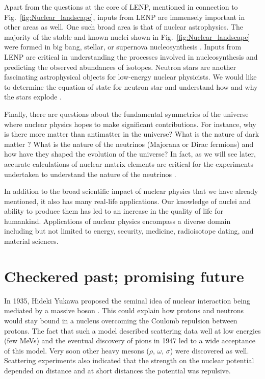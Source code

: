 	Apart from the questions at the core of LENP, mentioned in connection to
	Fig.~\ref{fig:Nuclear_landscape}, inputs from LENP are immensely important
	in other areas as well.  One such broad area is that of nuclear astrophysics.
	The majority of the stable
	and known nuclei shown in Fig.~\ref{fig:Nuclear_landscape} were formed in
	big bang, stellar, or supernova nucleosynthesis
	\cite{Cyburt:2015mya, PAS:9305903}.  Inputs from LENP are
	critical in understanding the processes involved in nucleosynthesis and
	predicting the observed abundances of isotopes.
	Neutron stars are another fascinating astrophysical objects for low-energy
	nuclear physicists.  We would like to determine the equation of state for
	neutron star and understand how and why the stars explode
	\cite{Lattimer:2015eaa}.

	Finally, there are questions about the fundamental symmetries of the universe
	where
	nuclear physics hopes to make significant contributions.  For instance,
	why is there more matter than antimatter in the universe?  What is the nature
	of dark matter \cite{Feng:2010gw}?  What is the nature of the neutrinos
	(Majorana or Dirac
	fermions) and how have they shaped the evolution of the universe?
	In fact, as we will see later, accurate calculations of nuclear matrix
	elements are critical for the experiments undertaken to understand the
	nature of the	neutrinos \cite{Avignone:2007fu}.

	In addition to the broad scientific impact of nuclear physics that we have
	already mentioned, it also has many real-life applications.  Our knowledge of
	nuclei and ability to produce them has led to an increase in the quality of
	life
	for humankind.  Applications of nuclear physics encompass a diverse
	domain including but not limited to energy, security, medicine,
	radioisotope dating, and material sciences.


	\section{Checkered past; promising future}

	In 1935, Hideki Yukawa proposed the seminal idea of nuclear interaction
	being mediated by a massive boson \cite{Yukawa:1935xg}.   This could explain
	how protons and neutrons would stay bound in a nucleus overcoming the Coulomb
	repulsion between protons.  The fact that such a model described scattering
	data well at low energies (few MeVs) and the eventual discovery of pions in
	1947 led to a wide acceptance of this model.  Very soon other heavy mesons
	($\rho$, $\omega$, $\sigma$) were discovered as well.  Scattering experiments
	also indicated that the strength on the nuclear potential depended on
	distance and at short distances the potential was repulsive.

